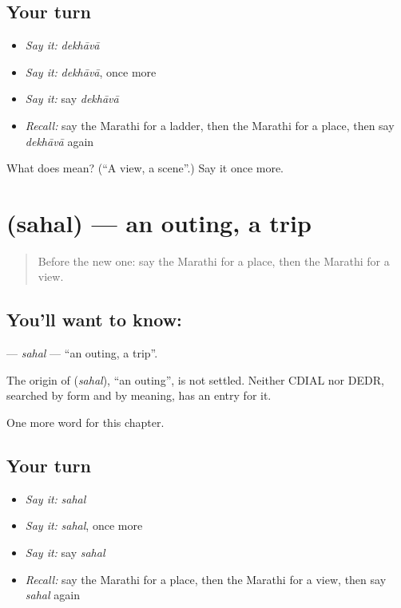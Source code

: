 \subsection*{Your turn}
\begin{itemize}
\raggedright
  \item \emph{Say it:} \emph{dekhāvā}
  \item \emph{Say it:} \emph{dekhāvā}, once more
  \item \emph{Say it:} say \emph{dekhāvā}
  \item \emph{Recall:} say the Marathi for a ladder, then the Marathi for a place, then say \emph{dekhāvā} again
\end{itemize}

\begin{tcolorbox}[breakable,colback=teal!4,colframe=teal!35!black,title={Before you move on}]
What does  mean? (\textquotedblleft{}A view, a scene\textquotedblright{}.) Say it once more.
\end{tcolorbox}
\section[\texorpdfstring{\mr{सहल} (sahal)}{सहल (sahal)}]{ (sahal) — an outing, a trip}

\label{lesson:MR-C243-sahal}



\begin{quote}
Before the new one: say the Marathi for a place, then the Marathi for a view.
\end{quote}

\subsection*{You'll want to know: }
\textbf{} — \emph{sahal} — \textquotedblleft{}an outing, a trip\textquotedblright{}.

\begin{cousinweb}
The origin of \textbf{} (\emph{sahal}), \textquotedblleft{}an outing\textquotedblright{}, is not settled. Neither CDIAL nor DEDR, searched by form and by meaning, has an entry for it.
\end{cousinweb}

\begin{grammarlens}[title={What you've built}]
One more word for this chapter.
\end{grammarlens}

\subsection*{Your turn}
\begin{itemize}
\raggedright
  \item \emph{Say it:} \emph{sahal}
  \item \emph{Say it:} \emph{sahal}, once more
  \item \emph{Say it:} say \emph{sahal}
  \item \emph{Recall:} say the Marathi for a place, then the Marathi for a view, then say \emph{sahal} again
\end{itemize}

